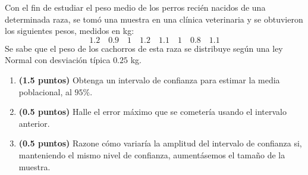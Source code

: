 
Con el fin de estudiar el peso medio de los perros recién nacidos de una determinada raza, se tomó una muestra en una clínica veterinaria y se obtuvieron los siguientes pesos, medidos en kg:
\[
1.2\quad0.9\quad1\quad1.2\quad1.1\quad1\quad0.8\quad1.1
\]
Se sabe que el peso de los cachorros de esta raza se distribuye según una ley Normal con desviación típica $0.25$ kg.
\begin{enumerate}[label=\alph*)]
\item \textbf{(1.5 puntos)} Obtenga un intervalo de confianza para estimar la media poblacional, al $95\%$.
\item \textbf{(0.5 puntos)} Halle el error máximo que se cometería usando el intervalo anterior.
\item \textbf{(0.5 puntos)} Razone cómo variaría la amplitud del intervalo de confianza si, manteniendo el mismo nivel de confianza, aumentásemos el tamaño de la muestra.
\end{enumerate}
